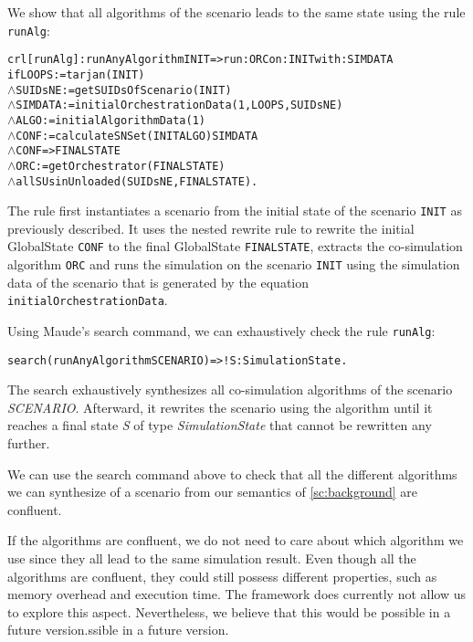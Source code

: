 We show that all algorithms of the scenario leads to the same state using the rule \texttt{runAlg}:
\small
\begin{alltt}
crl [runAlg] : runAnyAlgorithm INIT => run: ORC on: INIT with: SIMDATA
  if LOOPS := tarjan(INIT)
  \(\land\) SUIDsNE := getSUIDsOfScenario(INIT)
  \(\land\) SIMDATA := initialOrchestrationData(1,LOOPS,SUIDsNE)
  \(\land\) ALGO := initialAlgorithmData(1)
  \(\land\) CONF := calculateSNSet(INIT ALGO) SIMDATA 
  \(\land\) {CONF} => { FINALSTATE } 
  \(\land\) ORC := getOrchestrator(FINALSTATE)
  \(\land\) allSUsinUnloaded(SUIDsNE, FINALSTATE) .
\end{alltt}
\normalsize
The rule first instantiates a scenario from the initial state of the scenario \texttt{INIT} as previously described.
It uses the nested rewrite rule to rewrite the initial GlobalState \texttt{CONF} to the final GlobalState \texttt{FINALSTATE}, extracts the co-simulation algorithm \texttt{ORC} and runs the simulation on the scenario \texttt{INIT} using the simulation data of the scenario that is generated by the equation \texttt{initialOrchestrationData}.

Using Maude's search command, we can exhaustively check the rule \texttt{runAlg}:

\small
\begin{alltt}
  search (runAnyAlgorithm SCENARIO)  =>! S:SimulationState . 
\end{alltt}
\normalsize

The search exhaustively synthesizes all co-simulation algorithms of the scenario \textit{SCENARIO}. Afterward, it rewrites the scenario using the algorithm until it reaches a final state \textit{S} of type \textit{SimulationState} that cannot be rewritten any further.

We can use the search command above to check that all the different algorithms we can synthesize of a scenario from our semantics of \cref{sc:background} are confluent.


If the algorithms are confluent, we do not need to care about which algorithm we use since they all lead to the same simulation result.
Even though all the algorithms are confluent, they could still possess different properties, such as memory overhead and execution time. 
The framework does currently not allow us to explore this aspect.
Nevertheless, we believe that this would be possible in a future version.ssible in a future version.

